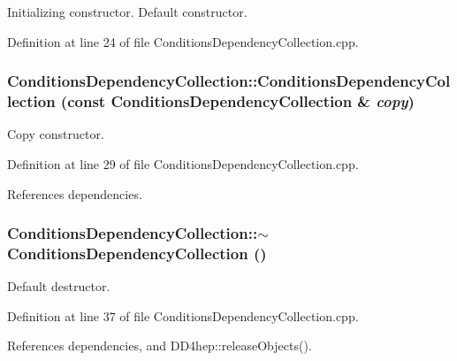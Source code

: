 Initializing constructor. Default constructor. 

Definition at line 24 of file ConditionsDependencyCollection.cpp.\hypertarget{class_d_d4hep_1_1_conditions_1_1_conditions_dependency_collection_a244d8717b93fb02a5899b00556a16da4}{
\subsubsection[{ConditionsDependencyCollection}]{\setlength{\rightskip}{0pt plus 5cm}ConditionsDependencyCollection::ConditionsDependencyCollection (const {\bf ConditionsDependencyCollection} \& {\em copy})}}
\label{class_d_d4hep_1_1_conditions_1_1_conditions_dependency_collection_a244d8717b93fb02a5899b00556a16da4}


Copy constructor. 

Definition at line 29 of file ConditionsDependencyCollection.cpp.

References dependencies.\hypertarget{class_d_d4hep_1_1_conditions_1_1_conditions_dependency_collection_ad09c3071e28a0cae78a9bc8945331619}{
\subsubsection[{$\sim$ConditionsDependencyCollection}]{\setlength{\rightskip}{0pt plus 5cm}ConditionsDependencyCollection::$\sim$ConditionsDependencyCollection ()}}
\label{class_d_d4hep_1_1_conditions_1_1_conditions_dependency_collection_ad09c3071e28a0cae78a9bc8945331619}


Default destructor. 

Definition at line 37 of file ConditionsDependencyCollection.cpp.

References dependencies, and DD4hep::releaseObjects().

